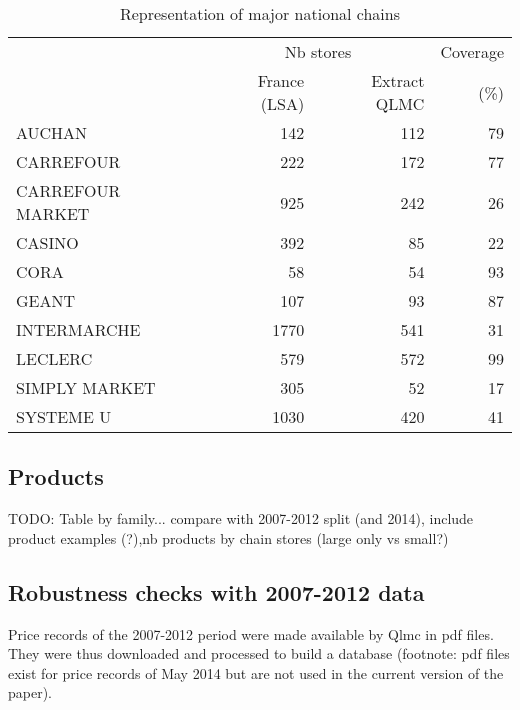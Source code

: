 \documentclass[11pt]{article}
\begin{document}
\begin{table}[H]
\renewcommand{\arraystretch}{0.7}%
\caption{Representation of major national chains}\label{tab:qlmc_chain_repr}
\small
\begin{tabular}{lrrr}
\toprule
{} &  \multicolumn{2}{c}{Nb stores}   &  Coverage      \\
{} &   France (LSA) & Extract QLMC    & (\%)           \\
\midrule
AUCHAN           &            142 &             112 &            79 \\
CARREFOUR        &            222 &             172 &            77 \\
CARREFOUR MARKET &            925 &             242 &            26 \\
CASINO           &            392 &              85 &            22 \\
CORA             &             58 &              54 &            93 \\
GEANT            &            107 &              93 &            87 \\
INTERMARCHE      &           1770 &             541 &            31 \\
LECLERC          &            579 &             572 &            99 \\
SIMPLY MARKET    &            305 &              52 &            17 \\
SYSTEME U        &           1030 &             420 &            41 \\
\bottomrule
\bottomrule
\end{tabular}
\end{table}

\subsection{Products}

TODO: Table by family... compare with 2007-2012 split (and 2014), include product examples (?),nb products by chain stores (large only vs small?)

\subsection{Robustness checks with 2007-2012 data}

Price records of the 2007-2012 period were made available by Qlmc in pdf files. They were thus downloaded and processed to build a database (footnote: pdf files exist for price records of May 2014 but are not used in the current version of the paper).
\end{document}
